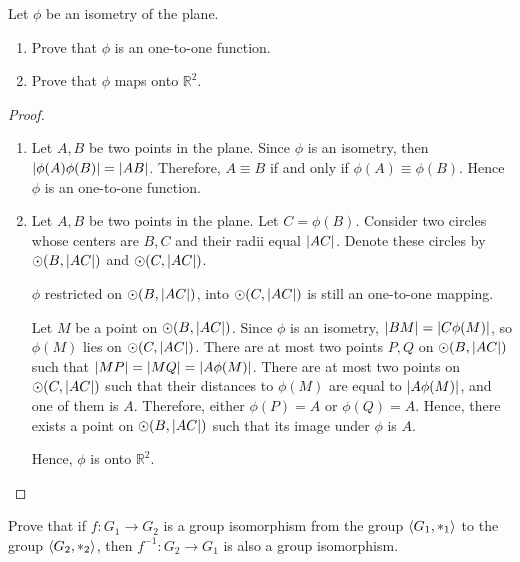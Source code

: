 \begin{exercise}
    Let $\phi$ be an isometry of the plane.
    \begin{enumerate}[label={\textbf{\alph*.}}]
        \item Prove that $\phi$ is an one-to-one function.
        \item Prove that $\phi$ maps onto $\mathbb{R}^{2}$.
    \end{enumerate}
\end{exercise}

\begin{proof}
    \begin{enumerate}[label={\textbf{\alph*.}}]
        \item Let $A, B$ be two points in the plane. Since $\phi$ is an isometry, then $\left\vert{\phi(A)\phi(B)}\right\vert = \left\vert{AB}\right\vert$. Therefore, $A\equiv B$ if and only if $\phi(A)\equiv\phi(B)$. Hence $\phi$ is an one-to-one function.
        \item Let $A, B$ be two points in the plane. Let $C = \phi(B)$. Consider two circles whose centers are $B, C$ and their radii equal $\left\vert{AC}\right\vert$. Denote these circles by $\odot(B, \left\vert{AC}\right\vert)$ and $\odot(C, \left\vert{AC}\right\vert)$.

              $\phi$ restricted on $\odot(B, \left\vert{AC}\right\vert)$, into $\odot(C, \left\vert{AC}\right\vert)$ is still an one-to-one mapping.

              Let $M$ be a point on $\odot(B, \left\vert{AC}\right\vert)$. Since $\phi$ is an isometry, $\left\vert{BM}\right\vert = \left\vert{C\phi(M)}\right\vert$, so $\phi(M)$ lies on $\odot(C, \left\vert{AC}\right\vert)$. There are at most two points $P, Q$ on $\odot(B, \left\vert{AC}\right\vert)$ such that $\left\vert{MP}\right\vert = \left\vert{MQ}\right\vert = \left\vert{A\phi(M)}\right\vert$. There are at most two points on $\odot(C, \left\vert{AC}\right\vert)$ such that their distances to $\phi(M)$ are equal to $\left\vert{A\phi(M)}\right\vert$, and one of them is $A$. Therefore, either $\phi(P) = A$ or $\phi(Q) = A$. Hence, there exists a point on $\odot(B, \left\vert{AC}\right\vert)$ such that its image under $\phi$ is $A$.

              Hence, $\phi$ is onto $\mathbb{R}^{2}$.
    \end{enumerate}
\end{proof}

\begin{exercise}
    Prove that if $f: G_{1} \to G_{2}$ is a group isomorphism from the group $\left\langle{G_{1}, {*}_{1}}\right\rangle$ to the group $\left\langle{G_{2}, {*}_{2}}\right\rangle$, then $f^{-1}: G_{2} \to G_{1}$ is also a group isomorphism.
\end{exercise}

